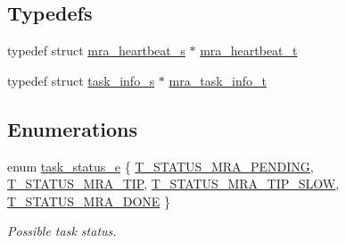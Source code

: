 \subsection*{\-Typedefs}
\begin{DoxyCompactItemize}
\item 
typedef struct \hyperlink{structmra__heartbeat__s}{mra\-\_\-heartbeat\-\_\-s} $\ast$ \hyperlink{common-mra_8h_a9a9d834f744f36f4e51ebf6c532e26bd}{mra\-\_\-heartbeat\-\_\-t}
\item 
typedef struct \hyperlink{structtask__info__s}{task\-\_\-info\-\_\-s} $\ast$ \hyperlink{common-mra_8h_a54f41524090023e9b283ecbef8b955d6}{mra\-\_\-task\-\_\-info\-\_\-t}
\end{DoxyCompactItemize}
\subsection*{\-Enumerations}
\begin{DoxyCompactItemize}
\item 
enum \hyperlink{common-mra_8h_aadf6e8ce08a315d3a320b05b2bcf27c7}{task\-\_\-status\-\_\-e} \{ \hyperlink{common-mra_8h_aadf6e8ce08a315d3a320b05b2bcf27c7a107af46c195ca17124951f9da9e4516e}{\-T\-\_\-\-S\-T\-A\-T\-U\-S\-\_\-\-M\-R\-A\-\_\-\-P\-E\-N\-D\-I\-N\-G}, 
\hyperlink{common-mra_8h_aadf6e8ce08a315d3a320b05b2bcf27c7a834ab8fd9011e98aadb58a05c2bcca7a}{\-T\-\_\-\-S\-T\-A\-T\-U\-S\-\_\-\-M\-R\-A\-\_\-\-T\-I\-P}, 
\hyperlink{common-mra_8h_aadf6e8ce08a315d3a320b05b2bcf27c7aad2c0fd8c428d4848bcbfe0e338bed95}{\-T\-\_\-\-S\-T\-A\-T\-U\-S\-\_\-\-M\-R\-A\-\_\-\-T\-I\-P\-\_\-\-S\-L\-O\-W}, 
\hyperlink{common-mra_8h_aadf6e8ce08a315d3a320b05b2bcf27c7a51f9b001d2b46f2aa6399622d2277520}{\-T\-\_\-\-S\-T\-A\-T\-U\-S\-\_\-\-M\-R\-A\-\_\-\-D\-O\-N\-E}
 \}
\begin{DoxyCompactList}\small\item\em \-Possible task status. \end{DoxyCompactList}\end{DoxyCompactItemize}
